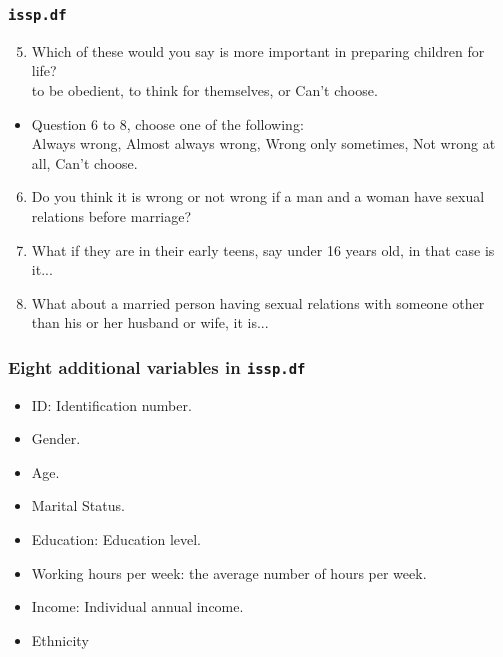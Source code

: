 \documentclass[handout]{beamer}\usepackage[]{graphicx}\usepackage[]{color}
\begin{document}
\begin{frame}
\frametitle{\texttt{issp.df}}
\begin{enumerate}
\setcounter{enumi}{4}
\item Which of these would you say is more important in preparing children for life?\\
to be obedient, to think for themselves, or Can't choose.
\end{enumerate}
\begin{itemize}
\item Question 6 to 8, choose one of the following: \\
Always wrong, Almost always wrong, Wrong only sometimes, Not wrong at all, Can't choose.
\end{itemize}
\begin{enumerate}
\setcounter{enumi}{5}
\item Do you think it is wrong or not wrong if a man and a woman have sexual relations before marriage?
\item What if they are in their early teens, say under 16 years old, in that case is it...
\item What about a married person having sexual relations with someone other than his or her husband or wife, it is...
\end{enumerate}
\end{frame}

\begin{frame}
\frametitle{Eight additional variables in \texttt{issp.df}}
\begin{itemize}
\item ID: Identification number.
\item Gender.
\item Age.
\item Marital Status.
\item Education: Education level.
\item Working hours per week: the average number of hours per week.
\item Income: Individual annual income.
\item Ethnicity
\end{itemize}
\end{frame}
\end{document}
